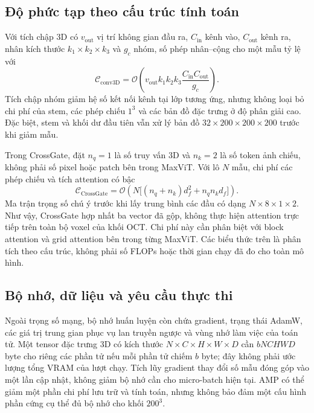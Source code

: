\documentclass[14pt,a4paper,oneside]{extreport}
\begin{document}
\subsection{Độ phức tạp theo cấu trúc tính toán}
Với tích chập 3D có $v_{\mathrm{out}}$ vị trí không gian đầu ra,
$C_{\mathrm{in}}$ kênh vào, $C_{\mathrm{out}}$ kênh ra, nhân kích
thước $k_1\times k_2\times k_3$ và $g_c$ nhóm, số phép nhân--cộng
cho một mẫu tỷ lệ với
\begin{equation}
 \mathcal C_{\mathrm{conv3D}}=
 \mathcal O\!\left(v_{\mathrm{out}}k_1k_2k_3
 \frac{C_{\mathrm{in}}C_{\mathrm{out}}}{g_c}\right).
\end{equation}
Tích chập nhóm giảm hệ số kết nối kênh tại lớp tương ứng, nhưng
không loại bỏ chi phí của stem, các phép chiếu $1^3$ và các bản đồ
đặc trưng ở độ phân giải cao. Đặc biệt, stem và khối dư đầu tiên
vẫn xử lý bản đồ $32\times200\times200\times200$ trước khi giảm mẫu.

Trong CrossGate, đặt $n_q=1$ là số truy vấn 3D và $n_k=2$ là số
token ảnh chiếu, không phải số pixel hoặc patch bên trong MaxViT.
Với lô $N$ mẫu, chi phí các phép chiếu và tích attention có bậc
\begin{equation}
 \mathcal C_{\mathrm{CrossGate}}=
 \mathcal O\!\left(N\bigl[(n_q+n_k)d_f^2+n_qn_kd_f\bigr]\right).
\end{equation}
Ma trận trọng số chú ý trước khi lấy trung bình các đầu có dạng
$N\times8\times1\times2$. Như vậy, CrossGate hợp nhất ba vector
đã gộp, không thực hiện attention trực tiếp trên toàn bộ voxel của
khối OCT. Chi phí này cần phân biệt với block attention và grid
attention bên trong từng MaxViT. Các biểu thức trên là phân tích
theo cấu trúc, không phải số FLOPs hoặc thời gian chạy đã đo cho
toàn mô hình.

\subsection{Bộ nhớ, dữ liệu và yêu cầu thực thi}
Ngoài trọng số mạng, bộ nhớ huấn luyện còn chứa gradient, trạng thái
AdamW, các giá trị trung gian phục vụ lan truyền ngược và vùng nhớ
làm việc của toán tử. Một tensor đặc trưng 3D có kích thước
$N\times C\times H\times W\times D$ cần $bNCHWD$ byte cho riêng
các phần tử nếu mỗi phần tử chiếm $b$ byte; đây không phải ước lượng
tổng VRAM của lượt chạy. Tích lũy gradient thay đổi số mẫu đóng góp
vào một lần cập nhật, không giảm bộ nhớ cần cho micro-batch hiện tại.
AMP có thể giảm một phần chi phí lưu trữ và tính toán, nhưng không
bảo đảm một cấu hình phần cứng cụ thể đủ bộ nhớ cho khối $200^3$.
\end{document}
